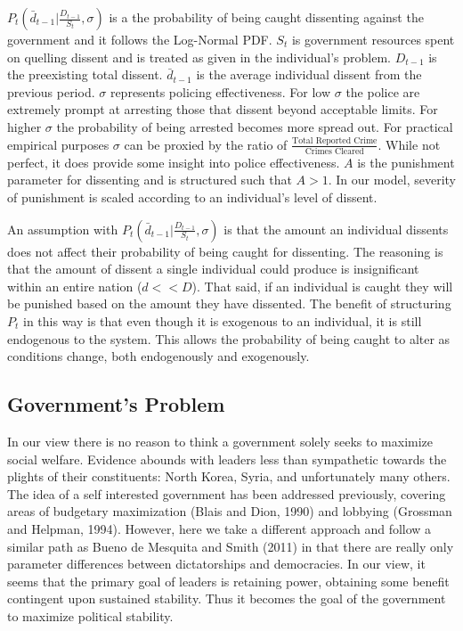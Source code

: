 \documentclass[12pt]{article}
\begin{document}
\begin{spacing}{1.5}
$ P_t \left( \bar{d}_{t-1} \Bigg|\frac{D_{t-1}}{S_t},\sigma \right)$ is a the probability of being caught dissenting against the government and it follows the Log-Normal PDF. $S_t$ is government resources spent on quelling dissent and is treated as given in the individual's problem. $D_{t-1}$ is the preexisting total dissent. $\bar{d}_{t-1}$ is the average individual dissent from the previous period. $\sigma$ represents policing effectiveness. For low $\sigma$ the police are extremely prompt at arresting those that dissent beyond acceptable limits. For higher $\sigma$ the probability of being arrested becomes more spread out. For practical empirical purposes $\sigma$ can be proxied by the ratio of $\frac{\text{Total Reported Crime}}{\text{Crimes Cleared}}$. While not perfect, it does provide some insight into police effectiveness. $A$ is the punishment parameter for dissenting and is structured such that $A>1$. In our model, severity of punishment is scaled according to an individual's level of dissent. 

An assumption with $P_t \left( \bar{d}_{t-1} \Bigg|\frac{D_{t-1}}{S_t},\sigma \right)$ is that the amount an individual dissents does not affect their probability of being caught for dissenting. The reasoning is that the amount of dissent a single individual could produce is insignificant within an entire nation ($d<<D$). That said, if an individual is caught they will be punished based on the amount they have dissented. The benefit of structuring $P_t$ in this way is that even though it is exogenous to an individual, it is still endogenous to the system. This allows the probability of being caught to alter as conditions change, both endogenously and exogenously.    

\subsection{Government's Problem} 

In our view there is no reason to think a government solely seeks to maximize social welfare.  Evidence abounds with leaders less than sympathetic towards the plights of their constituents: North Korea, Syria, and unfortunately many others. The idea of a self interested government has been addressed previously, covering areas of budgetary maximization (Blais and Dion, 1990) and lobbying (Grossman and Helpman, 1994). However, here we take a different approach and follow a similar path as Bueno de Mesquita and Smith (2011) in that there are really only parameter differences between dictatorships and democracies. In our view, it seems that the primary goal of leaders is retaining power, obtaining some benefit contingent upon sustained stability. Thus it becomes the goal of the government to maximize political stability. 



\end{spacing}
\end{document}
